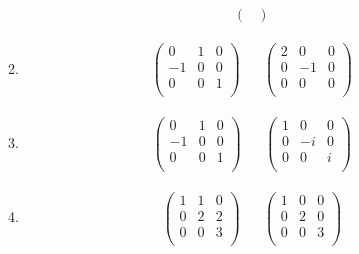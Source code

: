 \documentclass[../psets.tex]{subfiles}
\begin{document}
\begin{enumerate}[label={\textbf{6.\arabic*.}}]
\begin{enumerate}
\begin{align*}
\begin{pmatrix}
            \end{pmatrix}
        \end{align*}
        \item 
        \begin{align*}
            \begin{pmatrix}
                0 & 1 & 0\\
                -1 & 0 & 0\\
                0 & 0 & 1\\
            \end{pmatrix}&&
            \begin{pmatrix}
                2 & 0 & 0\\
                0 & -1 & 0\\
                0 & 0 & 0\\
            \end{pmatrix}
        \end{align*}
        \item 
        \begin{align*}
            \begin{pmatrix}
                0 & 1 & 0\\
                -1 & 0 & 0\\
                0 & 0 & 1\\
            \end{pmatrix}&&
            \begin{pmatrix}
                1 & 0 & 0\\
                0 & -i & 0\\
                0 & 0 & i\\
            \end{pmatrix}
        \end{align*}
        \item 
        \begin{align*}
            \begin{pmatrix}
                1 & 1 & 0\\
                0 & 2 & 2\\
                0 & 0 & 3\\
            \end{pmatrix}&&
            \begin{pmatrix}
                1 & 0 & 0\\
                0 & 2 & 0\\
                0 & 0 & 3\\
            \end{pmatrix}

\end{align*}
\end{enumerate}
\end{enumerate}
\end{document}
